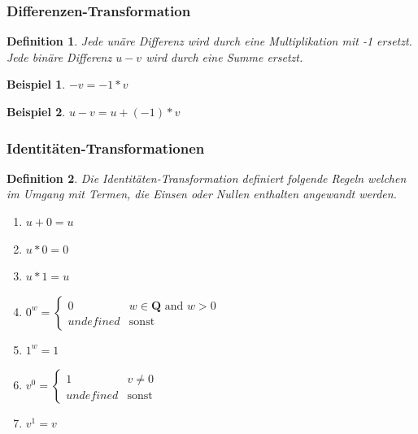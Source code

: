 \documentclass[11pt]{article}
\newtheorem{defin}{Definition}
\newtheorem{example}{Beispiel}
\begin{document}
\subsubsection{Differenzen-Transformation}
\begin{defin}
\label{def:differenzen_transformation}
Jede unäre Differenz wird durch eine Multiplikation mit -1 ersetzt. 
Jede binäre Differenz $u-v$ wird durch eine Summe ersetzt.
\end{defin}

\begin{example} \normalfont
  $-v = -1 * v$
\end{example}
  
\begin{example} \normalfont
  $u - v = u + (-1) * v $
\end{example}

\subsubsection{Identitäten-Transformationen}

\begin{defin}
  \label{def:identitaeten_transformation}
  Die Identitäten-Transformation definiert folgende Regeln welchen im Umgang mit Termen, die
  Einsen oder Nullen enthalten angewandt werden.
  \begin{enumerate}
    \item $u+0 = u$
    \item $u*0 = 0$
    \item $u*1 = u$
    \item $
            0^w = \left\{
                \begin{array}{ll}
                    0         & w \in \mathbf{Q} \textrm{ and } w > 0 \\
                    undefined & \textrm{sonst}
                \end{array}
            \right.$
    \item $1^w = 1$
    \item $
          v^0 = \left\{
              \begin{array}{ll}
                  1         & v \neq 0 \\
                  undefined & \textrm{sonst}
              \end{array}
          \right.
          $
    \item $v^1 = v$
  \end{enumerate}
\end{defin}
\end{document}
